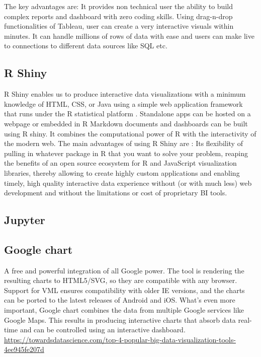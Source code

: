 \documentclass[]{book}
\theoremstyle{definition}
\theoremstyle{definition}
\theoremstyle{definition}
\theoremstyle{remark}
\begin{document}
The key advantages are: It provides non technical user the ability to
build complex reports and dashboard with zero coding skills. Using
drag-n-drop functionalities of Tableau, user can create a very
interactive visuals within minutes. It can handle millions of rows of
data with ease and users can make live to connections to different data
sources like SQL etc.

\subsection{R Shiny}\label{r-shiny}

R Shiny enables us to produce interactive data visualizations with a
minimum knowledge of HTML, CSS, or Java using a simple web application
framework that runs under the R statistical platform
\citep{shiny_interactive_viz}. Standalone apps can be hosted on a
webpage or embedded in R Markdown documents and dashboards can be built
using R shiny. It combines the computational power of R with the
interactivity of the modern web. The main advantages of using R Shiny
are : Its flexibility of pulling in whatever package in R that you want
to solve your problem, reaping the benefits of an open source ecosystem
for R and JavaScript visualization libraries, thereby allowing to create
highly custom applications and enabling timely, high quality interactive
data experience without (or with much less) web development and without
the limitations or cost of proprietary BI tools.

\subsection{Jupyter}\label{jupyter}

\subsection{Google chart}\label{google-chart}

A free and powerful integration of all Google power. The tool is
rendering the resulting charts to HTML5/SVG, so they are compatible with
any browser. Support for VML ensures compatibility with older IE
versions, and the charts can be ported to the latest releases of Android
and iOS. What's even more important, Google chart combines the data from
multiple Google services like Google Maps. This results in producing
interactive charts that absorb data real-time and can be controlled
using an interactive dashboard.
\url{https://towardsdatascience.com/top-4-popular-big-data-visualization-tools-4ee945fe207d}
\end{document}
